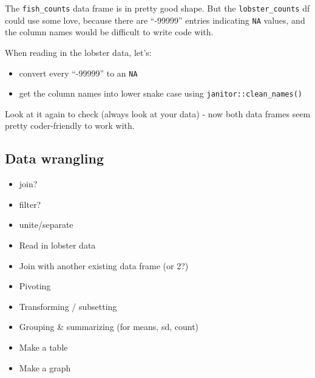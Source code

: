 \documentclass[]{book}
\newenvironment{Shaded}{\begin{snugshade}}{\end{snugshade}}
\newcommand{\DataTypeTok}[1]{\textcolor[rgb]{0.13,0.29,0.53}{#1}}
\newcommand{\KeywordTok}[1]{\textcolor[rgb]{0.13,0.29,0.53}{\textbf{#1}}}
\newcommand{\NormalTok}[1]{#1}
\newcommand{\OperatorTok}[1]{\textcolor[rgb]{0.81,0.36,0.00}{\textbf{#1}}}
\newcommand{\StringTok}[1]{\textcolor[rgb]{0.31,0.60,0.02}{#1}}
\providecommand{\tightlist}{%
  \setlength{\itemsep}{0pt}\setlength{\parskip}{0pt}}
\begin{document}
The \texttt{fish\_counts} data frame is in pretty good shape. But the \texttt{lobster\_counts} df could use some love, because there are ``-99999'' entries indicating \texttt{NA} values, and the column names would be difficult to write code with.

When reading in the lobster data, let's:

\begin{itemize}
\tightlist
\item
  convert every ``-99999'' to an \texttt{NA}
\item
  get the column names into lower snake case using \texttt{janitor::clean\_names()}
\end{itemize}

\begin{Shaded}
\end{Shaded}

Look at it again to check (always look at your data) - now both data frames seem pretty coder-friendly to work with.

\hypertarget{data-wrangling}{%
\subsection{Data wrangling}\label{data-wrangling}}

\begin{itemize}
\item
  join?
\item
  filter?
\item
  unite/separate
\item
  Read in lobster data
\item
  Join with another existing data frame (or 2?)
\item
  Pivoting
\item
  Transforming / subsetting
\item
  Grouping \& summarizing (for means, sd, count)
\item
  Make a table
\item
  Make a graph
\end{itemize}
\end{document}
